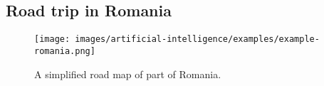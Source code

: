 \subsection{Road trip in Romania \cite{ai/book/Artificial-Intelligence-A-Modern-Approach/Russell-Norvig}}


\begin{figure}[H]
    \centering
    \texttt{[image: images/artificial-intelligence/examples/example-romania.png]}
    \caption*{A simplified road map of part of Romania. \cite{ai/book/Artificial-Intelligence-A-Modern-Approach/Russell-Norvig}}
\end{figure}








